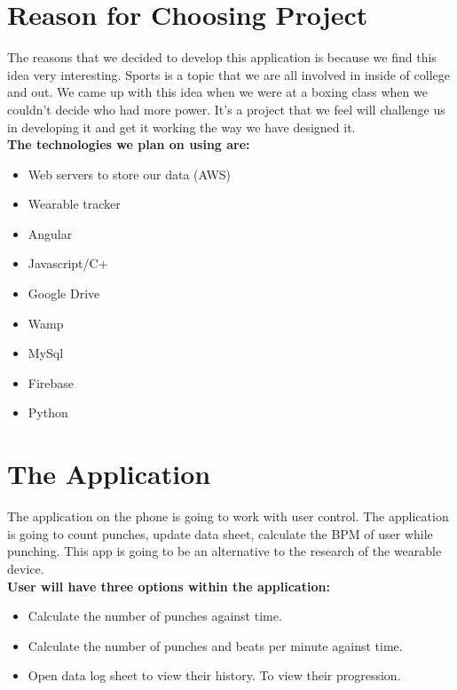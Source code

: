 \documentclass[a4paper,12pt]{report}
\begin{document}
\section{Reason for Choosing Project}
The reasons that we decided to develop this application is because we find this idea very interesting. Sports is a topic that we are all involved in inside of college and out. We came up with this idea when we were at a boxing class when we couldn't decide who had more power. It’s a project that we feel will challenge us in developing it and get it working the way we have designed it.
\\
\textbf{The technologies we plan on using are:}
\begin{itemize}
\item{Web servers to store our data (AWS)}
\item{Wearable tracker}
\item{Angular}
\item{Javascript/C+}
\item{Google Drive}
\item{Wamp}
\item{MySql}
\item{Firebase}
\item{Python}
\end{itemize}

\section{The Application}
The application on the phone is going to work with user control. The application is going to count punches, update data sheet, calculate the BPM of user while punching. This app is going to be an alternative to the research of the wearable device.
\\
\textbf{User will have three options within the application:}
\begin{itemize}
\item Calculate the number of punches against time.
\item Calculate the number of punches and beats per minute against time.
\item Open data log sheet to view their history. To view their progression.
\end{itemize}
\end{document}
